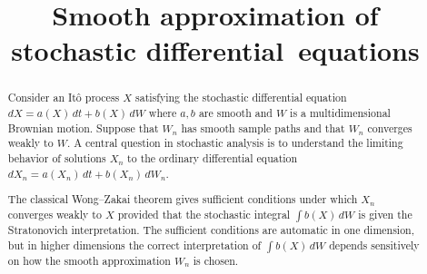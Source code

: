 \documentclass[aop,MSNbibl,seceqn,dvips]{arximspdf}
\begin{document}
%
\begin{frontmatter}

\title{Smooth approximation of stochastic differential~equations}



\begin{abstract}
Consider an It\^o process $X$ satisfying the stochastic differential equation
$dX=a(X) \,dt+b(X) \,dW$ where $a,b$ are smooth and $W$ is a
multidimensional Brownian motion.
Suppose that $W_n$ has smooth sample paths and that $W_n$ converges
weakly to $W$. A central question in stochastic analysis is to
understand the limiting behavior of solutions $X_n$ to the ordinary
differential equation $dX_n=a(X_n) \,dt+b(X_n) \,dW_n$.

The classical Wong--Zakai theorem gives sufficient conditions under
which $X_n$ converges weakly to $X$ provided that the stochastic
integral $\int b(X) \,dW$ is given the Stratonovich interpretation. The
sufficient conditions are automatic in one dimension, but in higher
dimensions the correct interpretation of
$\int b(X) \,dW$ depends sensitively on how the smooth approximation
$W_n$ is chosen.


\end{abstract}
\end{frontmatter}
\end{document}
